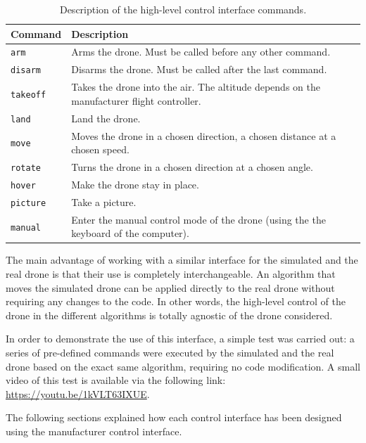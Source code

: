 \begin{table}[H]
    \centering
    \begin{tabular}{|l|p{10cm}|}
        \hline
        \textbf{Command} & \textbf{Description} \\ \hline
        \hline
        \texttt{arm} & Arms the drone. Must be called before any other command. \\ \hline
        \texttt{disarm} & Disarms the drone. Must be called after the last command. \\ \hline
        \texttt{takeoff} & Takes the drone into the air. The altitude depends on the manufacturer flight controller. \\ \hline
        \texttt{land} & Land the drone. \\ \hline
        \texttt{move} & Moves the drone in a chosen direction, a chosen distance at a chosen speed. \\ \hline
        \texttt{rotate} & Turns the drone in a chosen direction at a chosen angle. \\ \hline
        \texttt{hover} & Make the drone stay in place. \\ \hline
        \texttt{picture} & Take a picture. \\ \hline
        \texttt{manual} & Enter the manual control mode of the drone (using the the keyboard of the computer). \\ \hline
    \end{tabular}
    \caption{Description of the high-level control interface commands.}
    \label{tab:04.control.commands.description}
\end{table}

The main advantage of working with a similar interface for the simulated and the real drone is that their use is completely interchangeable. An algorithm that moves the simulated drone can be applied directly to the real drone without requiring any changes to the code. In other words, the high-level control of the drone in the different algorithms is totally agnostic of the drone considered.

In order to demonstrate the use of this interface, a simple test was carried out: a series of pre-defined commands were executed by the simulated and the real drone based on the exact same algorithm, requiring no code modification. A small video of this test is available via the following link: \url{https://youtu.be/1kVLT63IXUE}.

The following sections explained how each control interface has been designed using the manufacturer control interface.

